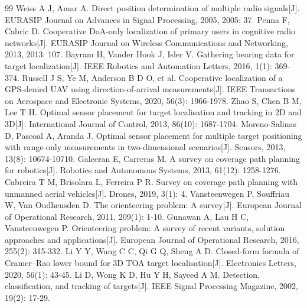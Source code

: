 \documentclass[withoutpreface,bwprint]{cumcmthesis}
\begin{document}
\tableofcontents
\clearpage












\begin{thebibliography}{99}
 Weiss A J, Amar A. Direct position determination of multiple radio signals[J]. EURASIP Journal on Advances in Signal Processing, 2005, 2005: 37.
 Penna F, Cabric D. Cooperative DoA-only localization of primary users in cognitive radio networks[J]. EURASIP Journal on Wireless Communications and Networking, 2013, 2013: 107.
 Bayram H, Vander Hook J, Isler V. Gathering bearing data for target localization[J]. IEEE Robotics and Automation Letters, 2016, 1(1): 369-374.
 Russell J S, Ye M, Anderson B D O, et al. Cooperative localization of a GPS-denied UAV using direction-of-arrival measurements[J]. IEEE Transactions on Aerospace and Electronic Systems, 2020, 56(3): 1966-1978.
 Zhao S, Chen B M, Lee T H. Optimal sensor placement for target localisation and tracking in 2D and 3D[J]. International Journal of Control, 2013, 86(10): 1687-1704.
 Moreno-Salinas D, Pascoal A, Aranda J. Optimal sensor placement for multiple target positioning with range-only measurements in two-dimensional scenarios[J]. Sensors, 2013, 13(8): 10674-10710.
 Galceran E, Carreras M. A survey on coverage path planning for robotics[J]. Robotics and Autonomous Systems, 2013, 61(12): 1258-1276.
 Cabreira T M, Brisolara L, Ferreira P R. Survey on coverage path planning with unmanned aerial vehicles[J]. Drones, 2019, 3(1): 4.
 Vansteenwegen P, Souffriau W, Van Oudheusden D. The orienteering problem: A survey[J]. European Journal of Operational Research, 2011, 209(1): 1-10.
 Gunawan A, Lau H C, Vansteenwegen P. Orienteering problem: A survey of recent variants, solution approaches and applications[J]. European Journal of Operational Research, 2016, 255(2): 315-332.
 Li Y Y, Wang C C, Qi G Q, Sheng A D. Closed-form formula of Cramer--Rao lower bound for 3D TOA target localisation[J]. Electronics Letters, 2020, 56(1): 43-45.
 Li D, Wong K D, Hu Y H, Sayeed A M. Detection, classification, and tracking of targets[J]. IEEE Signal Processing Magazine, 2002, 19(2): 17-29.
\end{thebibliography}

\begin{appendices}

\end{appendices}
\end{document}
